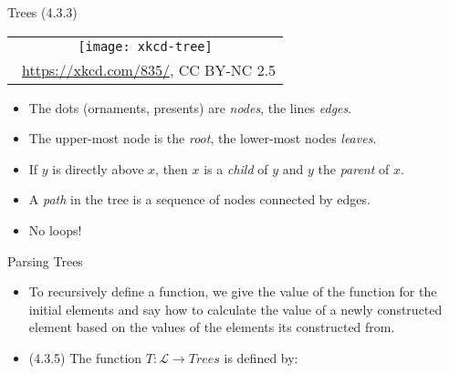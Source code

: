 \documentclass[../slides.tex]{subfiles}
\begin{document}
\begin{frame}{Trees (4.3.3)}

	\begin{center}
		\begin{tabular}{c}
		\texttt{[image: xkcd-tree]}\\[-1ex]
		{\tiny \textcopyright~\url{https://xkcd.com/835/}, CC BY-NC 2.5}
		\end{tabular}
		\end{center}

	\begin{itemize}
		
		\item The dots (ornaments, presents) are {\it nodes}, the lines {\it edges}. 
		
		\item The upper-most node is the {\it root}, the lower-most nodes {\it leaves}. 
		
		\item If $y$ is directly above $x$, then $x$ is a {\it child} of $y$ and $y$ the \emph{parent} of $x$. 
		
		\item A {\it path} in the tree is a sequence of nodes connected by edges. 
		
		\item No loops!
		
	\end{itemize}

\end{frame}

\begin{frame}{Parsing Trees}

	\begin{itemize}
	
 		\item \alert{To recursively define a function, we give the value of the function for the initial elements and say how to calculate the value of a newly constructed element based on the values of the elements its constructed from.}
		
		\item (4.3.5) The function $T:\mathcal{L}\to Trees$ is defined by:
		
		\begin{center}
\end{center}

	\end{itemize}


\end{frame}
\end{document}
